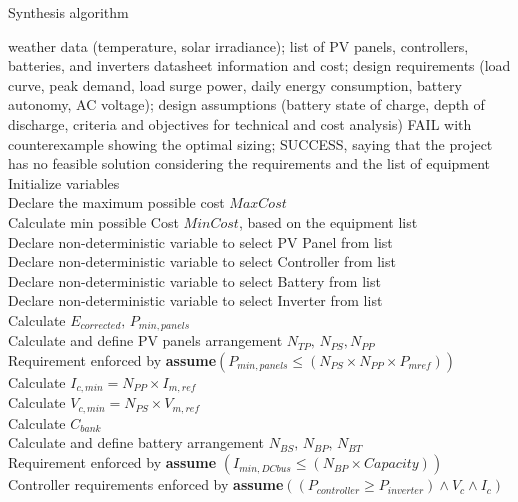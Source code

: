  \begin{algorithm}
 \caption{Synthesis algorithm}
 \begin{algorithmic}[1]
 \renewcommand{\algorithmicrequire}{\textbf{Input:}}
 \renewcommand{\algorithmicensure}{\textbf{Output:}}
  \REQUIRE weather data (temperature, solar irradiance); list of PV panels, controllers, batteries, and inverters datasheet information and cost; design requirements (load curve, peak demand, load surge power, daily energy consumption, battery autonomy, AC voltage); design assumptions (battery state of charge, depth of discharge, criteria and objectives for technical and cost analysis)
 \ENSURE FAIL with counterexample showing the optimal sizing; SUCCESS, saying that the project has no feasible solution considering the requirements and the list of equipment
  \STATE Initialize variables \\
  \STATE Declare the maximum possible cost $MaxCost$  \\
  \STATE Calculate min possible Cost $MinCost$, based on the equipment list \\
 	\STATE Declare non-deterministic variable to select PV Panel from list \\
 	\STATE Declare non-deterministic variable to select Controller from list \\
 	\STATE Declare non-deterministic variable to select Battery from list \\
 	\STATE Declare non-deterministic variable to select Inverter from list \\ 	
 	\STATE Calculate $E_{corrected}, \, P_{min,panels} $ \\
	\STATE Calculate and define PV panels arrangement $N_{TP}, \, N_{PS}, N_{PP} $ \\
	\STATE Requirement enforced by \textbf{assume}$(P_{min,panels} \leq (N_{PS} \times N_{PP} \times P_{mref}))$ \\
	\STATE Calculate $I_{c,min} = N_{PP} \times I_{m,ref}$ \\
	\STATE Calculate $V_{c,min} = N_{PS} \times V_{m,ref}$ \\
 	\STATE Calculate $C_{bank}$ \\
	\STATE Calculate and define battery arrangement $N_{BS}, \, N_{BP}, \, N_{BT}$ \\
	\STATE Requirement enforced by \textbf{assume} $(I_{min,DCbus} \leq (N_{BP} \times Capacity))$ \\
 	\STATE Controller requirements enforced by \textbf{assume}$((P_{controller} \geq P_{inverter}) \wedge V_{c} \wedge I_{c})$ \\

\end{algorithmic}
\end{algorithm}

